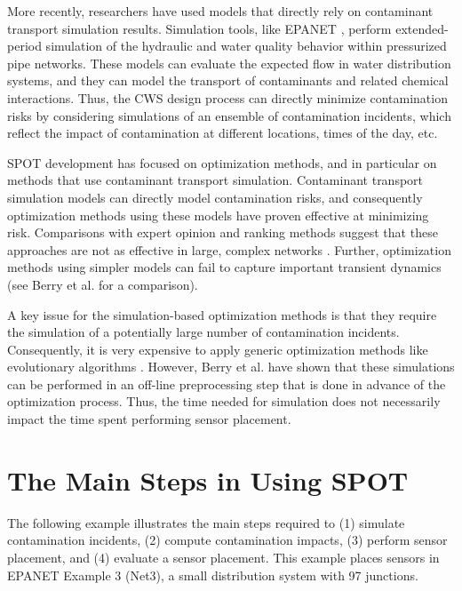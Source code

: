 \begin{itemize}
More recently, researchers have used models that directly rely on contaminant transport simulation results. Simulation tools, like EPANET \cite{EPANET}, perform extended-\/period simulation of the hydraulic and water quality behavior within pressurized pipe networks. These models can evaluate the expected flow in water distribution systems, and they can model the transport of contaminants and related chemical interactions. Thus, the CWS design process can directly minimize contamination risks by considering simulations of an ensemble of contamination incidents, which reflect the impact of contamination at different locations, times of the day, etc.

\end{itemize}

SPOT development has focused on optimization methods, and in particular on methods that use contaminant transport simulation. Contaminant transport simulation models can directly model contamination risks, and consequently optimization methods using these models have proven effective at minimizing risk. Comparisons with expert opinion and ranking methods suggest that these approaches are not as effective in large, complex networks \cite{Ost07,BerHarPhiUbeWal05}. Further, optimization methods using simpler models can fail to capture important transient dynamics (see Berry et al. 
\cite{BerHarPhi05} for a comparison).

A key issue for the simulation-\/based optimization methods is that they require the simulation of a potentially large number of contamination incidents. Consequently, it is very expensive to apply generic optimization methods like evolutionary algorithms 
\cite{OstSal04}. However, Berry et al. 
\cite{BerHarPhiUbeWat06} have shown that these simulations can be performed in an off-\/line preprocessing step that is done in advance of the optimization process. Thus, the time needed for simulation does not necessarily impact the time spent performing sensor placement.

\section{The Main Steps in Using SPOT}\label{example_gStarted3}

The following example illustrates the main steps required to (1)
simulate contamination incidents, (2) compute contamination impacts,
(3) perform sensor placement, and (4) evaluate a sensor placement. This
example places sensors in EPANET Example 3 (Net3), a small distribution
system with 97 junctions.

